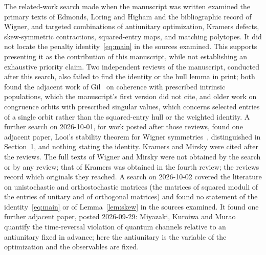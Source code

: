 \documentclass[11pt]{article}
\begin{document}
The related-work search made when the manuscript was written examined
the primary texts of Edmonds, Loring and Higham and the bibliographic
record of Wigner, and
targeted combinations of antiunitary optimization, Kramers defects,
skew-symmetric contractions, squared-entry maps, and matching polytopes.
It did not locate the penalty identity~\eqref{eq:main} in the sources
examined. This supports presenting it as the contribution of this
manuscript, while not establishing an exhaustive priority claim. Two
independent reviews of the manuscript, conducted after this search,
also failed to find the identity or the hull lemma in print; both
found the adjacent work of Gil~\cite{gil} on coherence with prescribed
intrinsic populations, which the manuscript's first version did not cite, and
older work on congruence orbits with prescribed singular values, which
concerns selected entries of a single orbit rather than the
squared-entry hull or the weighted identity. A further search on 2026-10-01, for work posted after those
reviews, found one adjacent paper, Looi's stability theorem for Wigner
symmetries~\cite{looi}, distinguished in Section~1, and nothing stating
the identity. Kramers and Mirsky were cited after the reviews. The full
texts of Wigner and Mirsky were not obtained by the search or by any
review; that of Kramers was obtained in the fourth review; the reviews
record which originals they reached. A search on 2026-10-02 covered the literature on unistochastic and
orthostochastic matrices (the matrices of squared moduli of the entries
of unitary and of orthogonal matrices) and found no statement of the
identity~\eqref{eq:main} or of Lemma~\ref{lem:skew} in the sources
examined. It found one further adjacent paper, posted 2026-09-29:
Miyazaki, Kuroiwa and Murao~\cite{miyazaki} quantify the time-reversal
violation of quantum channels relative to an antiunitary fixed in advance;
here the antiunitary is the variable of the optimization and the
observables are fixed.
\end{document}
